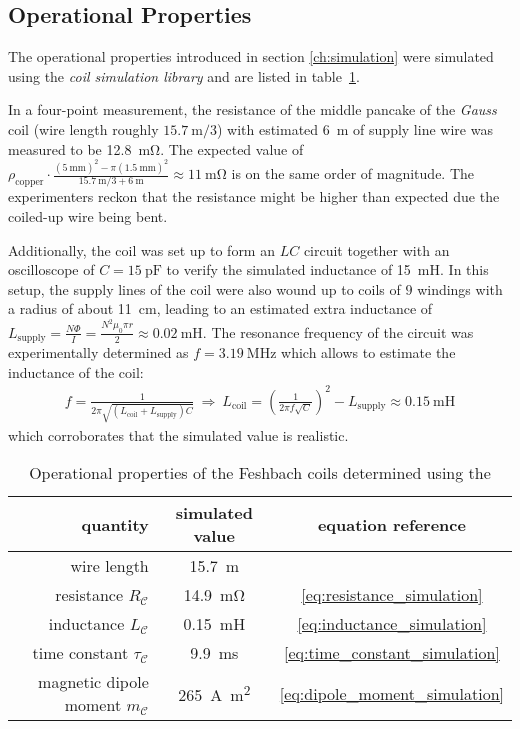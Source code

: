 \subsection*{Operational Properties}
The operational properties introduced in section \ref{ch:simulation} were simulated using the \textit{coil simulation library} and are listed in table~\ref{tab:operational_properties}.

In a four-point measurement, the resistance of the middle pancake of the \textit{Gauss} coil (wire length roughly $\SI{15.7}{\meter}/3$) with estimated \SI{6}{\meter} of supply line wire was measured to be \SI{12.8}{\milli\ohm}. The expected value of $\rho_\text{copper} \cdot \frac{(\SI{5}{\milli\meter})^2 - \pi(\SI{1.5}{\milli\meter})^2}{\SI{15.7}{\meter}/3 + \SI{6}{\meter}} \approx \SI{11}{\milli\ohm}$ is on the same order of magnitude. The experimenters reckon that the resistance might be higher than expected due the coiled-up wire being bent.

Additionally, the coil was set up to form an $LC$ circuit together with an oscilloscope of $C = \SI{15}{\pico\farad}$ to verify the simulated inductance of \SI{15}{\milli\henry}. In this setup, the supply lines of the coil were also wound up to coils of $9$ windings with a radius of about \SI{11}{\centi\meter}, leading to an estimated extra inductance of $L_\text{supply} = \frac{N\Phi}{I} = \frac{N^2\mu_0\pi r}{2} \approx \SI{0.02}{\milli\henry}$. The resonance frequency of the circuit was experimentally determined as $f = \SI{3.19}{\mega\hertz}$ which allows to estimate the inductance of the coil:
\begin{align}
    f = \frac{1}{2\pi \sqrt{(L_\text{coil} + L_\text{supply})C}} ~\Rightarrow~ L_\text{coil} = \left(\frac{1}{2\pi f \sqrt{C}}\right)^2 - L_\text{supply} \approx \SI{0.15}{\milli\henry}
\end{align}
which corroborates that the simulated value is realistic.

\begin{table}
    \centering
    \begin{tabular}{rcc}
        \toprule
        \textbf{quantity} & \textbf{simulated value}  & \textbf{equation reference} \\
        \toprule
        wire length & \SI{15.7}{\meter} & \\
        resistance $R_\mathcal{C}$ & \SI{14.9}{\milli\ohm} & \eqref {eq:resistance_simulation} \\
        inductance $L_\mathcal{C}$ & \SI{0.15}{\milli\henry} & \eqref{eq:inductance_simulation} \\ 
        time constant $\tau_\mathcal{C}$ & \SI{9.9}{\milli\second} & \eqref{eq:time_constant_simulation}\\
        magnetic dipole moment $m_\mathcal{C}$ & \SI{265}{\ampere\square\meter} & \eqref{eq:dipole_moment_simulation} \\
        \bottomrule
    \end{tabular}
    \caption{Operational properties of the Feshbach coils determined using the }
    \label{tab:operational_properties}
\end{table}

